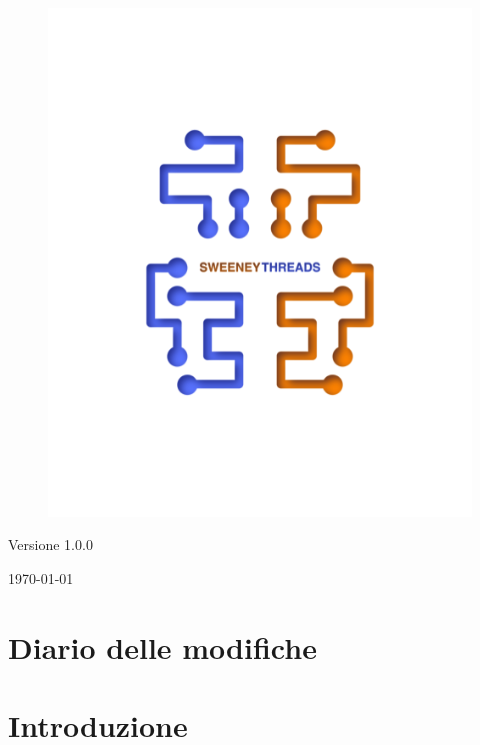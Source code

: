 \documentclass[a4paper]{article}
\begin{document}
\begin{titlepage}
		\begin{figure}[H]
			\centering
			\includegraphics[scale=0.8]{sweeney.png}
		\end{figure}
		\begin{center}
			Versione 1.0.0
		\end{center}
		{\large \today}\\[3cm] 
		\vfill  
	\end{titlepage}
	
	
	\tableofcontents
	
	\newpage 
	\section*{Diario delle modifiche}

	\newpage \section{Introduzione}
\end{document}
